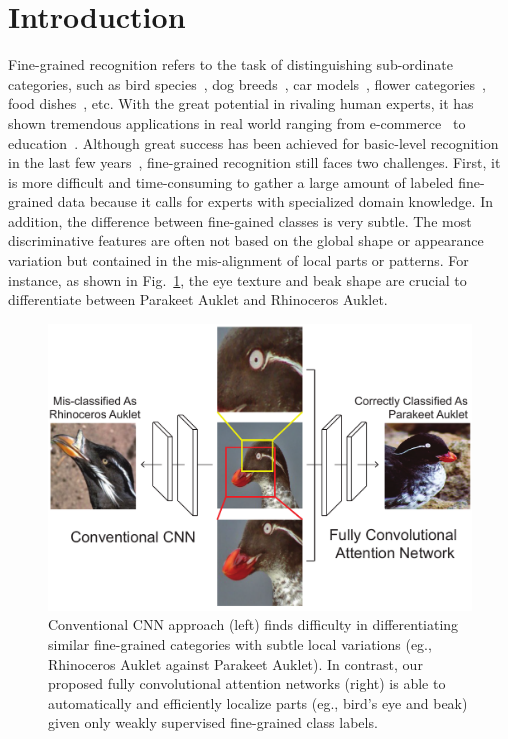 \documentclass[10pt,twocolumn,letterpaper]{article}
\begin{document}
\section{Introduction}
Fine-grained recognition refers to the task of distinguishing sub-ordinate categories, such as bird species~\cite{bd6}, dog breeds~\cite{bd4}, car models~\cite{bd5}, flower categories~\cite{NilsbackZ08,CuiZLB16}, food dishes~\cite{BossardGG14,ZhouL16}, etc.
With the great potential in rivaling human experts, it has shown tremendous applications in real world ranging from e-commerce~\cite{Bala15,KiapourHLBB15} to education~\cite{KumarBBJKLS12,BergLLAJB14}.
Although great success has been achieved for basic-level recognition in the last few years~\cite{KrizhevskySH12,bd7,he2015deep}, fine-grained recognition still faces two challenges.
First, it is more difficult and time-consuming to gather a large amount of labeled fine-grained data because it calls for experts with specialized domain knowledge.
In addition, the difference between fine-gained classes is very subtle.
The most discriminative features are often not based on the global shape or appearance variation but contained in the mis-alignment of local parts or patterns.
For instance, as shown in Fig.~\ref{fig:teaser}, the eye texture and beak shape are crucial to differentiate between Parakeet Auklet and Rhinoceros Auklet.

\begin{figure}
\begin{center}
\includegraphics[width=.5\textwidth]{figs/teaser_v2.pdf}
\end{center}
\caption{Conventional CNN approach (left) finds difficulty in differentiating similar fine-grained categories with subtle local variations (eg., Rhinoceros Auklet against Parakeet Auklet).
In contrast, our proposed fully convolutional attention networks (right) is able to automatically and efficiently localize parts (eg., bird's eye and beak) given only weakly supervised fine-grained class labels.
}
\label{fig:teaser}
\end{figure}
\end{document}
